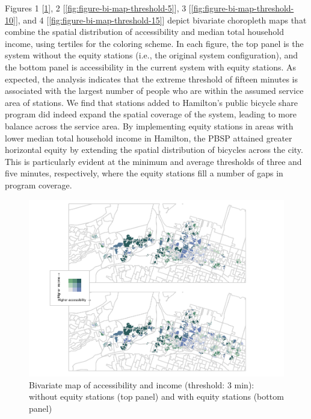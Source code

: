 \documentclass[]{elsarticle} %
\begin{document}
Figures 1 {[}\ref{fig:figure-bi-map-threshold-3}{]}, 2
{[}\ref{fig:figure-bi-map-threshold-5}{]}, 3
{[}\ref{fig:figure-bi-map-threshold-10}{]}, and 4
{[}\ref{fig:figure-bi-map-threshold-15}{]} depict bivariate choropleth
maps that combine the spatial distribution of accessibility and median
total household income, using tertiles for the coloring scheme. In each
figure, the top panel is the system without the equity stations (i.e.,
the original system configuration), and the bottom panel is
accessibility in the current system with equity stations. As expected,
the analysis indicates that the extreme threshold of fifteen minutes is
associated with the largest number of people who are within the assumed
service area of stations. We find that stations added to Hamilton's
public bicycle share program did indeed expand the spatial coverage of
the system, leading to more balance across the service area. By
implementing equity stations in areas with lower median total household
income in Hamilton, the PBSP attained greater horizontal equity by
extending the spatial distribution of bicycles across the city. This is
particularly evident at the minimum and average thresholds of three and
five minutes, respectively, where the equity stations fill a number of
gaps in program coverage.

\begin{figure}
\includegraphics[width=1\linewidth]{Bike-share-spatial-equity_files/figure-latex/figure-bi-map-threshold-3-1} \caption{\label{fig-bivariate-map-threshold-3}Bivariate map of accessibility and income (threshold: 3 min): without equity stations (top panel) and with equity stations (bottom panel)}\label{fig:figure-bi-map-threshold-3}
\end{figure}
\end{document}

